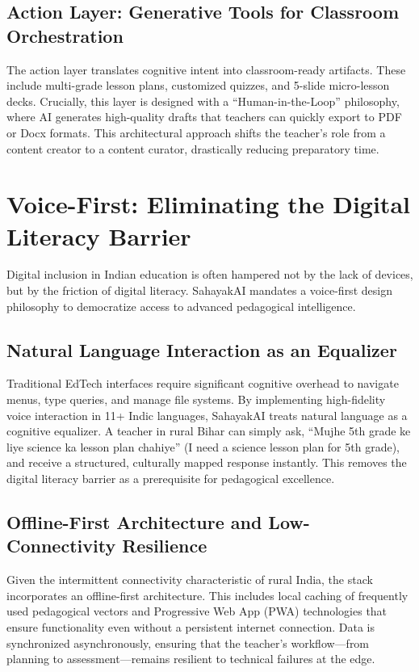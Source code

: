\documentclass[11pt,a4paper]{article}
\begin{document}
\subsection{Action Layer: Generative Tools for Classroom Orchestration}
The action layer translates cognitive intent into classroom-ready artifacts. These include multi-grade lesson plans, customized quizzes, and 5-slide micro-lesson decks. Crucially, this layer is designed with a ``Human-in-the-Loop'' philosophy, where AI generates high-quality drafts that teachers can quickly export to PDF or Docx formats. This architectural approach shifts the teacher's role from a content creator to a content curator, drastically reducing preparatory time.

\section{Voice-First: Eliminating the Digital Literacy Barrier}
Digital inclusion in Indian education is often hampered not by the lack of devices, but by the friction of digital literacy. SahayakAI mandates a voice-first design philosophy to democratize access to advanced pedagogical intelligence.

\subsection{Natural Language Interaction as an Equalizer}
Traditional EdTech interfaces require significant cognitive overhead to navigate menus, type queries, and manage file systems. By implementing high-fidelity voice interaction in 11+ Indic languages, SahayakAI treats natural language as a cognitive equalizer. A teacher in rural Bihar can simply ask, ``Mujhe 5th grade ke liye science ka lesson plan chahiye'' (I need a science lesson plan for 5th grade), and receive a structured, culturally mapped response instantly. This removes the digital literacy barrier as a prerequisite for pedagogical excellence.

\subsection{Offline-First Architecture and Low-Connectivity Resilience}
Given the intermittent connectivity characteristic of rural India, the stack incorporates an offline-first architecture. This includes local caching of frequently used pedagogical vectors and Progressive Web App (PWA) technologies that ensure functionality even without a persistent internet connection. Data is synchronized asynchronously, ensuring that the teacher's workflow---from planning to assessment---remains resilient to technical failures at the edge.
\end{document}

